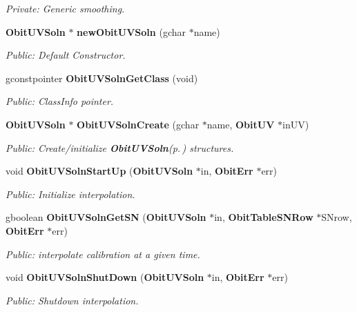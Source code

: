 \begin{CompactItemize}
\begin{CompactList}\small\item\em Private: Generic smoothing. \item\end{CompactList}\item 
{\bf Obit\-UVSoln} $\ast$ {\bf new\-Obit\-UVSoln} (gchar $\ast$name)
\begin{CompactList}\small\item\em Public: Default Constructor. \item\end{CompactList}\item 
gconstpointer {\bf Obit\-UVSoln\-Get\-Class} (void)
\begin{CompactList}\small\item\em Public: Class\-Info pointer. \item\end{CompactList}\item 
{\bf Obit\-UVSoln} $\ast$ {\bf Obit\-UVSoln\-Create} (gchar $\ast$name, {\bf Obit\-UV} $\ast$in\-UV)
\begin{CompactList}\small\item\em Public: Create/initialize {\bf Obit\-UVSoln}{\rm (p.\,\pageref{structObitUVSoln})} structures. \item\end{CompactList}\item 
void {\bf Obit\-UVSoln\-Start\-Up} ({\bf Obit\-UVSoln} $\ast$in, {\bf Obit\-Err} $\ast$err)
\begin{CompactList}\small\item\em Public: Initialize interpolation. \item\end{CompactList}\item 
gboolean {\bf Obit\-UVSoln\-Get\-SN} ({\bf Obit\-UVSoln} $\ast$in, {\bf Obit\-Table\-SNRow} $\ast$SNrow, {\bf Obit\-Err} $\ast$err)
\begin{CompactList}\small\item\em Public: interpolate calibration at a given time. \item\end{CompactList}\item 
void {\bf Obit\-UVSoln\-Shut\-Down} ({\bf Obit\-UVSoln} $\ast$in, {\bf Obit\-Err} $\ast$err)
\begin{CompactList}\small\item\em Public: Shutdown interpolation. \item\end{CompactList}\item 

\end{CompactItemize}
